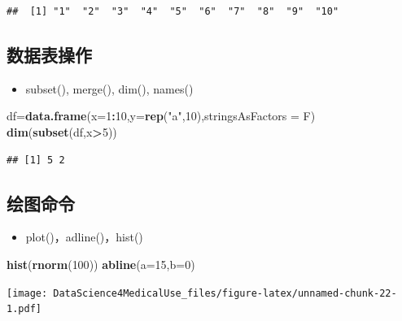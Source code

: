 \documentclass[]{book}
\newenvironment{Shaded}{\begin{snugshade}}{\end{snugshade}}
\newcommand{\DataTypeTok}[1]{\textcolor[rgb]{0.13,0.29,0.53}{#1}}
\newcommand{\DecValTok}[1]{\textcolor[rgb]{0.00,0.00,0.81}{#1}}
\newcommand{\KeywordTok}[1]{\textcolor[rgb]{0.13,0.29,0.53}{\textbf{#1}}}
\newcommand{\NormalTok}[1]{#1}
\newcommand{\OperatorTok}[1]{\textcolor[rgb]{0.81,0.36,0.00}{\textbf{#1}}}
\newcommand{\StringTok}[1]{\textcolor[rgb]{0.31,0.60,0.02}{#1}}
\providecommand{\tightlist}{%
  \setlength{\itemsep}{0pt}\setlength{\parskip}{0pt}}
\begin{document}
\begin{verbatim}
##  [1] "1"  "2"  "3"  "4"  "5"  "6"  "7"  "8"  "9"  "10"
\end{verbatim}

\hypertarget{section-13}{%
\subsection{数据表操作}\label{section-13}}

\begin{itemize}
\tightlist
\item
  subset(), merge(), dim(), names()
\end{itemize}

\begin{Shaded}
\begin{Highlighting}[]
\NormalTok{df=}\KeywordTok{data.frame}\NormalTok{(}\DataTypeTok{x=}\DecValTok{1}\OperatorTok{:}\DecValTok{10}\NormalTok{,}\DataTypeTok{y=}\KeywordTok{rep}\NormalTok{(}\StringTok{"a"}\NormalTok{,}\DecValTok{10}\NormalTok{),}\DataTypeTok{stringsAsFactors =}\NormalTok{ F)}
\KeywordTok{dim}\NormalTok{(}\KeywordTok{subset}\NormalTok{(df,x}\OperatorTok{>}\DecValTok{5}\NormalTok{))}
\end{Highlighting}
\end{Shaded}

\begin{verbatim}
## [1] 5 2
\end{verbatim}

\hypertarget{section-14}{%
\subsection{绘图命令}\label{section-14}}

\begin{itemize}
\tightlist
\item
  plot()，adline()，hist()
\end{itemize}

\begin{Shaded}
\begin{Highlighting}[]
\KeywordTok{hist}\NormalTok{(}\KeywordTok{rnorm}\NormalTok{(}\DecValTok{100}\NormalTok{))}
\KeywordTok{abline}\NormalTok{(}\DataTypeTok{a=}\DecValTok{15}\NormalTok{,}\DataTypeTok{b=}\DecValTok{0}\NormalTok{)}
\end{Highlighting}
\end{Shaded}

\texttt{[image: DataScience4MedicalUse\_files/figure-latex/unnamed-chunk-22-1.pdf]}
\end{document}
